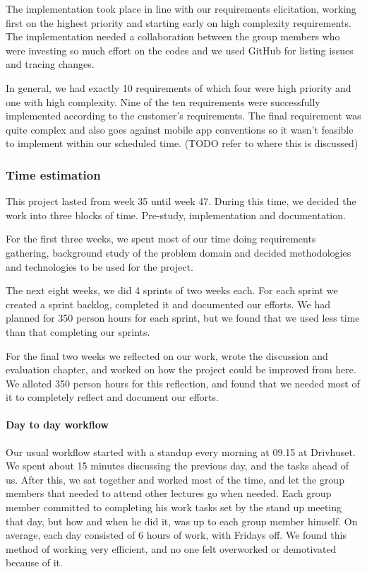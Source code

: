 The implementation took place in line with our requirements elicitation, working
first on the highest priority and starting early on high complexity
requirements.  The implementation needed a collaboration between the group
members who were investing so much effort on the codes and we used GitHub for
listing issues and tracing changes.

In general, we had exactly 10 requirements of which four were high priority and
one with high complexity.  Nine of the ten requirements were successfully
implemented according to the customer's requirements.  The final requirement was
quite complex and also goes against mobile app conventions so it wasn't feasible
to implement within our scheduled time. (TODO refer to where this is discussed)

	\subsubsection{Time estimation}
  This project lasted from week 35 until week 47. During this time, we decided
  the work into three blocks of time. Pre-study, implementation and
  documentation. 
  
  For the first three weeks, we spent most of our time doing
  requirements gathering, background study of the problem domain and decided
  methodologies and technologies to be used for the project.

  The next eight weeks, we did 4 sprints of two weeks each. For each sprint we
  created a sprint backlog, completed it and documented our efforts. We had
  planned for 350 person hours for each sprint, but we found that we used less
  time than that completing our sprints. 

  For the final two weeks we reflected on our work, wrote the discussion and
  evaluation chapter, and worked on how the project could be improved from here.
  We alloted 350 person hours for this reflection, and found that we needed most
  of it to completely reflect and document our efforts. 
  
  \paragraph{Day to day workflow}
  Our usual workflow started with a standup every morning at 09.15 at Drivhuset.
  We spent about 15 minutes discussing the previous day, and the tasks ahead of
  us. After this, we sat together and worked most of the time, and let the group
  members that needed to attend other lectures go when needed. Each group member
  committed to completing his work tasks set by the stand up meeting that day,
  but how and when he did it, was up to each group member himself. On average,
  each day consisted of 6 hours of work, with Fridays off. We found this method
  of working very efficient, and no one felt overworked or demotivated because
  of it.

